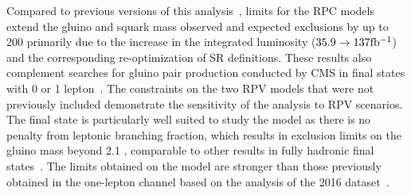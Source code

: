 Compared to previous versions of this
analysis~\cite{CMS:mySUS2016,CMS:SUS16041}, limits for the RPC models extend
the gluino and squark mass observed and expected exclusions by up to 200\GeV
primarily due to the increase in the integrated luminosity
($35.9\rightarrow\mathrm{137{fb}{}^{-1}}$) and the corresponding re-optimization of
SR definitions. These results also complement searches for gluino pair
production conducted by CMS in final states with 0 or 1
lepton~\cite{CMS:2019tlp,CMS:Sirunyan2019ctn,CMS:Sirunyan2019xwh}. The
constraints on the two RPV models that were not previously included
demonstrate the sensitivity of the analysis to RPV scenarios. The final state
is particularly well suited to study the \ToqqqqL model as there is no
penalty from leptonic branching fraction, which results in exclusion limits
on the gluino mass beyond 2.1 \TeV, comparable to other results in fully
hadronic final states~\cite{CMS:Sirunyan2019ctn,CMS:Sirunyan2019xwh}. The
limits obtained on the \Totbs model are stronger than those previously
obtained in the one-lepton channel based on the analysis of the 2016
dataset~\cite{CMS:Sirunyan2017dhe}.

